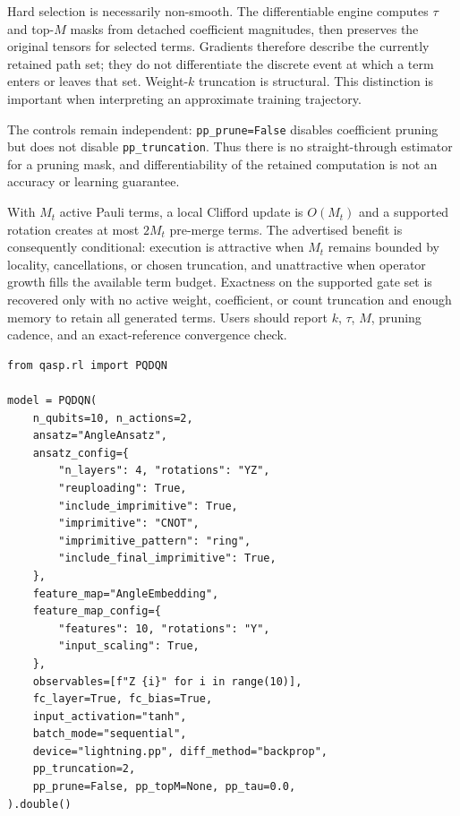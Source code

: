 \documentclass[10pt]{article}
\newcommand{\qasp}{\textsc{Qasp}}
\newcommand{\code}[1]{\texttt{#1}}
\begin{document}
Hard selection is necessarily non-smooth.  The differentiable engine computes $\tau$ and top-$M$ masks from detached coefficient magnitudes, then preserves the original tensors for selected terms.  Gradients therefore describe the currently retained path set; they do not differentiate the discrete event at which a term enters or leaves that set.  Weight-$k$ truncation is structural.  This distinction is important when interpreting an approximate training trajectory.

The controls remain independent: \code{pp\_prune=False} disables coefficient
pruning but does not disable \code{pp\_truncation}.  Thus there is no
straight-through estimator for a pruning mask, and differentiability of the
retained computation is not an accuracy or learning guarantee.

With $M_t$ active Pauli terms, a local Clifford update is $O(M_t)$ and a supported rotation creates at most $2M_t$ pre-merge terms.  The advertised benefit is consequently conditional: execution is attractive when $M_t$ remains bounded by locality, cancellations, or chosen truncation, and unattractive when operator growth fills the available term budget.  Exactness on the supported gate set is recovered only with no active weight, coefficient, or count truncation and enough memory to retain all generated terms.  Users should report $k$, $\tau$, $M$, pruning cadence, and an exact-reference convergence check.

\begin{lstlisting}[caption={The ten-qubit \code{PQDQN} configuration used for
the $k=2$ Pauli-propagation benchmark.  In \qasp{}, \code{"lightning.pp"} is a
logical backend selector, not a separately installed PennyLane-Lightning
device.},label={lst:pp}]
from qasp.rl import PQDQN

model = PQDQN(
    n_qubits=10, n_actions=2,
    ansatz="AngleAnsatz",
    ansatz_config={
        "n_layers": 4, "rotations": "YZ",
        "reuploading": True,
        "include_imprimitive": True,
        "imprimitive": "CNOT",
        "imprimitive_pattern": "ring",
        "include_final_imprimitive": True,
    },
    feature_map="AngleEmbedding",
    feature_map_config={
        "features": 10, "rotations": "Y",
        "input_scaling": True,
    },
    observables=[f"Z {i}" for i in range(10)],
    fc_layer=True, fc_bias=True,
    input_activation="tanh",
    batch_mode="sequential",
    device="lightning.pp", diff_method="backprop",
    pp_truncation=2,
    pp_prune=False, pp_topM=None, pp_tau=0.0,
).double()
\end{lstlisting}
\end{document}
